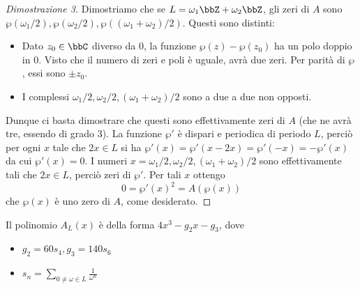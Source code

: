 \begin{proof}[Dimostrazione 3]
Dimostriamo che se $L=\omega_1\bbZ + \omega_2 \bbZ$, gli zeri di $A$ sono $ \wp(\omega_1/2), \wp(\omega_2/2), \wp((\omega_1+\omega_2)/2)$. Questi sono distinti: 
\begin{itemize}
\item Dato $z_0 \in \bbC$ diverso da $0$, la funzione $\wp(z) - \wp(z_0)$ ha un polo doppio in $0$. Visto che il numero di zeri e poli è uguale, avrà due zeri. Per parità di $\wp$, essi sono $\pm z_0$. 
\item I complessi $\omega_1/2, \omega_2/2, (\omega_1+\omega_2)/2$ sono a due a due non opposti.
\end{itemize} 
Dunque ci basta dimostrare che questi sono effettivamente zeri di $A$ (che ne avrà tre, essendo di grado 3). La funzione $\wp'$ è dispari e periodica di periodo $L$, perciò per ogni $x$ tale che $2x \in L$ si ha
$\wp'(x) = \wp'(x-2x) = \wp'(-x) = -\wp'(x)$
da cui $\wp'(x) = 0$. I numeri $x=\omega_1/2, \omega_2/2, (\omega_1+\omega_2)/2$ sono effettivamente tali che $2x \in L$, perciò zeri di $\wp'$. Per tali $x$ ottengo
$$ 0 = \wp'(x)^2 = A(\wp(x))$$
che $\wp(x)$ è uno zero di $A$, come desiderato.
\end{proof}

\begin{proposizione}
Il polinomio $A_L(x)$ è della forma $4x^3-g_2x-g_3$, dove
\begin{itemize}
\item $g_2=60s_4, g_3=140s_6$
\item $\displaystyle s_n = \sum_{0 \neq \omega \in L} \frac{1}{\omega^n} $
\end{itemize} 

\end{proposizione}

